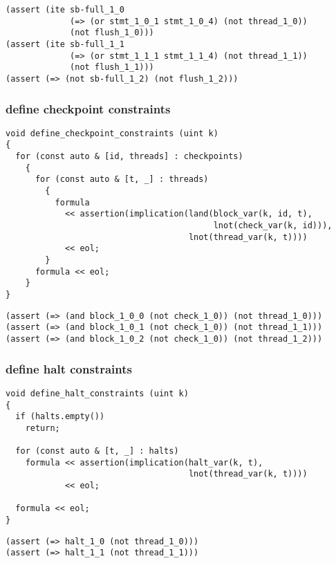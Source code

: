 \begin{lstlisting}[language=SMTLib]
(assert (ite sb-full_1_0
             (=> (or stmt_1_0_1 stmt_1_0_4) (not thread_1_0))
             (not flush_1_0)))
(assert (ite sb-full_1_1
             (=> (or stmt_1_1_1 stmt_1_1_4) (not thread_1_1))
             (not flush_1_1)))
(assert (=> (not sb-full_1_2) (not flush_1_2)))
\end{lstlisting}

\subsubsection{define checkpoint constraints}

\begin{lstlisting}[style=c++]
void define_checkpoint_constraints (uint k)
{
  for (const auto & [id, threads] : checkpoints)
    {
      for (const auto & [t, _] : threads)
        {
          formula
            << assertion(implication(land(block_var(k, id, t),
                                          lnot(check_var(k, id))),
                                     lnot(thread_var(k, t))))
            << eol;
        }
      formula << eol;
    }
}
\end{lstlisting}

\begin{lstlisting}[language=SMTLib]
(assert (=> (and block_1_0_0 (not check_1_0)) (not thread_1_0)))
(assert (=> (and block_1_0_1 (not check_1_0)) (not thread_1_1)))
(assert (=> (and block_1_0_2 (not check_1_0)) (not thread_1_2)))
\end{lstlisting}

\subsubsection{define halt constraints}

\begin{lstlisting}[style=c++]
void define_halt_constraints (uint k)
{
  if (halts.empty())
    return;

  for (const auto & [t, _] : halts)
    formula << assertion(implication(halt_var(k, t),
                                     lnot(thread_var(k, t))))
            << eol;

  formula << eol;
}
\end{lstlisting}

\begin{lstlisting}[language=SMTLib]
(assert (=> halt_1_0 (not thread_1_0)))
(assert (=> halt_1_1 (not thread_1_1)))
\end{lstlisting}


